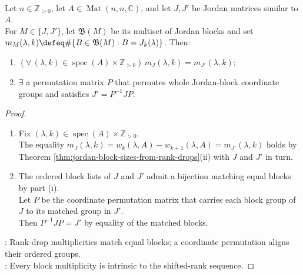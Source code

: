 \begin{corollary} \label{cor:jordan-form-unique-up-to-block-permutation} \\
Let $n\in\mathbb{Z}_{>0}$, let $A\in\operatorname{Mat}(n,n,\mathbb{C})$, and let $J,J'$ be Jordan matrices similar to $A$.\\
For $M\in\{J,J'\}$, let $\mathfrak{B}(M)$ be its multiset of Jordan blocks and set $m_M(\lambda,k)\defeq\#\{B\in\mathfrak{B}(M):B=J_k(\lambda)\}$. Then:
\begin{enumerate}[label=(\roman*)]
\setlength{\itemsep}{0pt}
\item $(\forall\,(\lambda,k)\in\operatorname{spec}(A)\times\mathbb{Z}_{>0})\,m_J(\lambda,k)=m_{J'}(\lambda,k)$;
\item $\exists$ a permutation matrix $P$ that permutes whole Jordan-block coordinate groups and satisfies $J'=P^{-1}JP$.
\end{enumerate}
\begin{proof}
\begin{enumerate}[label=(\roman*)]
\setlength{\itemsep}{0pt}
\item Fix $(\lambda,k)\in\operatorname{spec}(A)\times\mathbb{Z}_{>0}$.\\
The equality $m_J(\lambda,k)=w_k(\lambda,A)-w_{k+1}(\lambda,A)=m_{J'}(\lambda,k)$ holds by Theorem \ref{thm:jordan-block-sizes-from-rank-drops}(ii) with $J$ and $J'$ in turn.
\item The ordered block lists of $J$ and $J'$ admit a bijection matching equal blocks by part (i).\\
Let $P$ be the coordinate permutation matrix that carries each block group of $J$ to its matched group in $J'$.\\
Then $P^{-1}JP=J'$ by equality of the matched blocks.
\end{enumerate}
: Rank-drop multiplicities match equal blocks; a coordinate permutation aligns their ordered groups.\\
: Every block multiplicity is intrinsic to the shifted-rank sequence.
\end{proof}
\end{corollary}

